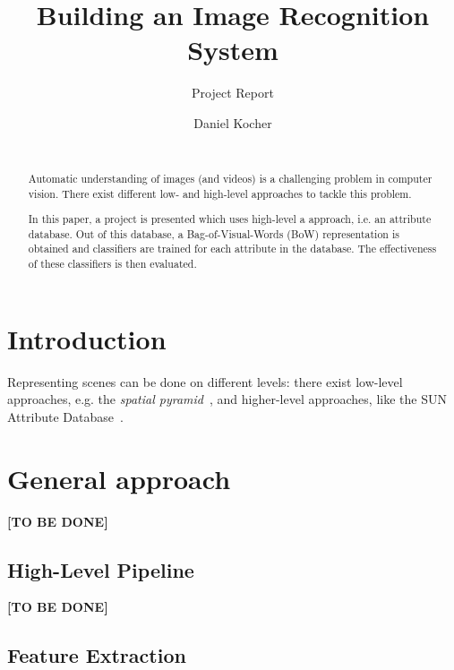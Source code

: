 \documentclass{vldb}
\newcommand{\tbd}{\textbf{[TO BE DONE]}}
\begin{document}
\title{Building an Image Recognition System}
\subtitle{Project Report}


\author{
\alignauthor
	Daniel Kocher\\
  \\
}

\maketitle

\begin{abstract}
Automatic understanding of images (and videos) is a challenging problem in
computer vision. There exist different low- and high-level approaches to tackle
this problem.

In this paper, a project is presented which uses high-level a approach, i.e. an
attribute database. Out of this database, a Bag-of-Visual-Words (BoW)
representation is obtained and classifiers are trained for each attribute in the
database. The effectiveness of these classifiers is then evaluated.
\end{abstract}

\section{Introduction}
\label{sec:introduction}

Representing scenes can be done on different levels: there exist
low-level approaches, e.g. the \emph{spatial pyramid}~\cite{Lazebnik:2006}, and
higher-level approaches, like the SUN Attribute Database~\cite{Patterson:2012}.


\section{General approach}
\label{sec:general-approach}

\tbd

\subsection{High-Level Pipeline}
\label{subsec:high-level-pipeline}

\tbd

\subsection{Feature Extraction}
\label{subsec:feature-extraction}
\end{document}
